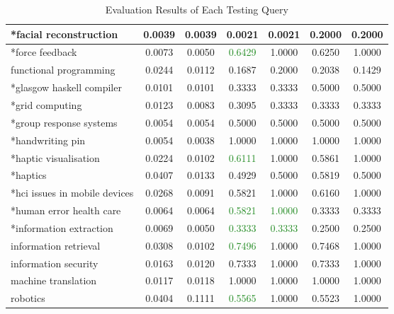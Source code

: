 \begin{table}
{\begin{tabular}{|l|c|c|c|c|c|c|}
\hline *facial reconstruction & 0.0039 & 0.0039 & 0.0021 & 0.0021 & 0.2000 & 0.2000 \\
\hline *force feedback & 0.0073 & 0.0050 & \textcolor{ForestGreen}{0.6429} & 1.0000 & 0.6250 & 1.0000 \\
\hline functional programming & 0.0244 & 0.0112 & 0.1687 & 0.2000 & 0.2038 & 0.1429 \\
\hline *glasgow haskell compiler & 0.0101 & 0.0101 & 0.3333 & 0.3333 & 0.5000 & 0.5000 \\
\hline *grid computing & 0.0123 & 0.0083 & 0.3095 & 0.3333 & 0.3333 & 0.3333 \\
\hline *group response systems & 0.0054 & 0.0054 & 0.5000 & 0.5000 & 0.5000 & 0.5000 \\
\hline *handwriting pin & 0.0054 & 0.0038 & 1.0000 & 1.0000 & 1.0000 & 1.0000 \\
\hline *haptic visualisation & 0.0224 & 0.0102 & \textcolor{ForestGreen}{0.6111} & 1.0000 & 0.5861 & 1.0000 \\
\hline *haptics & 0.0407 & 0.0133 & 0.4929 & 0.5000 & 0.5819 & 0.5000 \\
\hline *hci issues in mobile devices & 0.0268 & 0.0091 & 0.5821 & 1.0000 & 0.6160 & 1.0000 \\
\hline *human error health care & 0.0064 & 0.0064 & \textcolor{ForestGreen}{0.5821} & \textcolor{ForestGreen}{1.0000} & 0.3333 & 0.3333 \\
\hline *information extraction & 0.0069 & 0.0050 & \textcolor{ForestGreen}{0.3333} & \textcolor{ForestGreen}{0.3333} & 0.2500 & 0.2500 \\
\hline information retrieval & 0.0308 & 0.0102 & \textcolor{ForestGreen}{0.7496} & 1.0000 & 0.7468 & 1.0000 \\
\hline information security & 0.0163 & 0.0120 & 0.7333 & 1.0000 & 0.7333 & 1.0000 \\
\hline machine translation & 0.0117 & 0.0118 & 1.0000 & 1.0000 & 1.0000 & 1.0000 \\
\hline robotics & 0.0404 & 0.1111 & \textcolor{ForestGreen}{0.5565} & 1.0000 & 0.5523 & 1.0000\\
\hline

\end{tabular}
}
\caption{Evaluation Results of Each Testing Query} \label{table:eachqueryevaluationresult}
\end{table}

